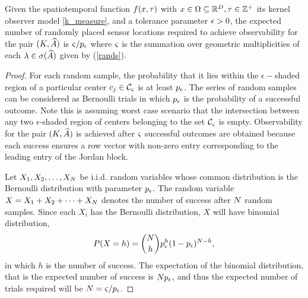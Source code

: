 \begin{theorem}\label{thm:r1}
	Given the spatiotemporal function $ f(x,\tau) $ with $ x \in \Omega \subseteq  \mathbb{R}^{D}, \tau\in \mathbb{Z}^+  $ its kernel observer model \eqref{k_measure}, and a tolerance parameter $\epsilon>0$, the expected number of randomly placed sensor locations required to achieve observability for the pair $ (K,\widehat{A}) $ is $ \varsigma/{p_{\epsilon}} $ where $ \varsigma $ is the summation over geometric multiplicities of each $ \lambda \in \sigma(\widehat{A}) $  given by  (\ref{rands}).
\end{theorem}
\begin{proof}
	For each random sample, the probability that it lies within the $ \epsilon- $shaded region of a particular center $ c_j \in \mathcal{C}_\varsigma$
	is at least $ p_{\epsilon} $. The series of random samples can be considered as Bernoulli trials in which $p_{\epsilon}$ is the probability of a successful outcome. Note this is assuming worst case scenario that the intersection between any two $ \epsilon $-shaded region of centers belonging to the set  $ \mathcal{C}_\varsigma $ is empty. Observability for the pair $ (K, \widehat{A}) $ is achieved after $ \varsigma  $ successful outcomes are obtained because each success ensures a row vector with non-zero entry corresponding to the leading entry of the Jordan block. 
	
	Let $ X_1, X_2, \dots, X_N $ be i.i.d. random variables whose common distribution is the Bernoulli distribution with parameter $p_{\epsilon}$. The random variable $ X = X_1 + X_2+ \dots+ X_N $ denotes the number of success after $ N $ random samples. Since each $ X_i $ has the Bernoulli distribution, $ X $ will have binomial distribution, 
	\begin{equation*}
	P(X=h) = {N \choose h}p_{\epsilon}^h (1-p_{\epsilon})^{N-h},
	\end{equation*}
	in which $ h  $ is the number of success. The expectation of the binomial distribution, that is the expected number of success is $ Np_{\epsilon} $, and thus the expected number of trials required will be $ N = \varsigma/p_{\epsilon}$.
\end{proof}

